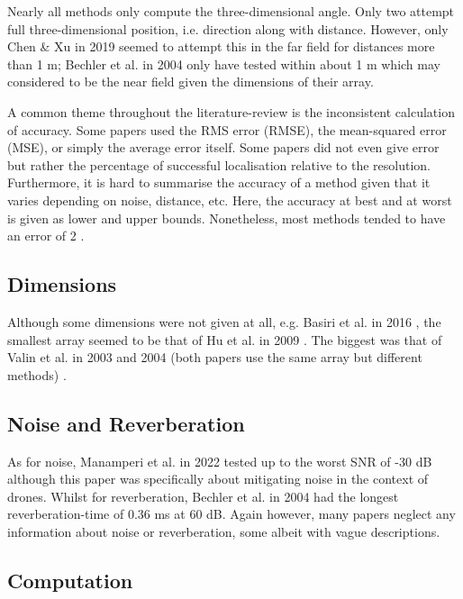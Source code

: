\documentclass[notitlepage]{report}
\begin{document}
Nearly all methods only compute the three-dimensional angle. Only two attempt full three-dimensional position, i.e. direction along with distance. However, only Chen \& Xu in 2019 \cite{chen_sound_2019} seemed to attempt this in the far field for distances more than 1 \si{m}; Bechler et al. in 2004 \cite{bechler_system_2004} only have tested within about 1 \si{m} which may considered to be the near field given the dimensions of their array.

A common theme throughout the literature-review is the inconsistent calculation of accuracy. Some papers used the RMS error (RMSE), the mean-squared error (MSE), or simply the average error itself. Some papers did not even give error but rather the percentage of successful localisation relative to the resolution. Furthermore, it is hard to summarise the accuracy of a method given that it varies depending on noise, distance, etc. Here, the accuracy at best and at worst is given as lower and upper bounds. Nonetheless, most methods tended to have an error of 2 \si{\deg}.

\subsection{Dimensions}

Although some dimensions were not given at all, e.g. Basiri et al. in 2016 \cite{basiri_-board_2016}, the smallest array seemed to be that of Hu et al. in 2009 \cite{hu_estimation_2009}. The biggest was that of Valin et al. in 2003 and 2004 (both papers use the same array but different methods) \cite{valin_robust_2003} \cite{valin_localization_2004}.

\subsection{Noise and Reverberation}

As for noise, Manamperi et al. in 2022 \cite{manamperi_drone_2022} tested up to the worst SNR of -30 \si{dB} although this paper was specifically about mitigating noise in the context of drones. Whilst for reverberation, Bechler et al. in 2004 \cite{bechler_system_2004} had the longest reverberation-time of 0.36 \si{ms} at 60 \si{dB}. Again however, many papers neglect any information about noise or reverberation, some albeit with vague descriptions.

\subsection{Computation}
\end{document}
